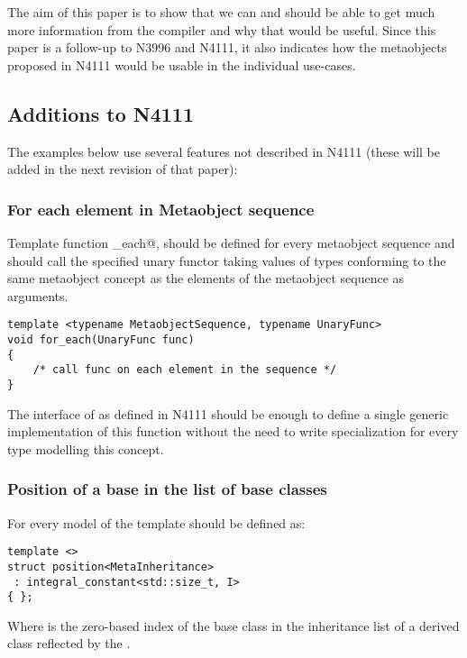 The aim of this paper is to show that we can and should be able to get much more
information from the compiler and why that would be useful. Since this paper is a follow-up
to N3996 and N4111, it also indicates how the metaobjects proposed in N4111 would
be usable in the individual use-cases.

\subsection{Additions to N4111}

The examples below use several features not described in N4111 (these will be added
in the next revision of that paper):

\subsubsection{For each element in Metaobject sequence}

Template function \verb@for_each@, should be defined for every metaobject sequence
and should call the specified unary functor taking values of types conforming to
the same metaobject concept as the elements of the metaobject sequence as arguments.

\begin{verbatim}
template <typename MetaobjectSequence, typename UnaryFunc>
void for_each(UnaryFunc func)
{
	/* call func on each element in the sequence */
}
\end{verbatim}

The interface of  as defined in N4111 should be enough
to define a single generic implementation of this function without the need
to write specialization for every type modelling this concept.

\subsubsection{Position of a base in the list of base classes}

For every model of  the \verb@position@ template should be defined as:

\begin{verbatim}
template <>
struct position<MetaInheritance>
 : integral_constant<std::size_t, I>
{ };
\end{verbatim}

Where \verb@I@ is the zero-based index of the base class in the inheritance list of a derived class
reflected by the .

